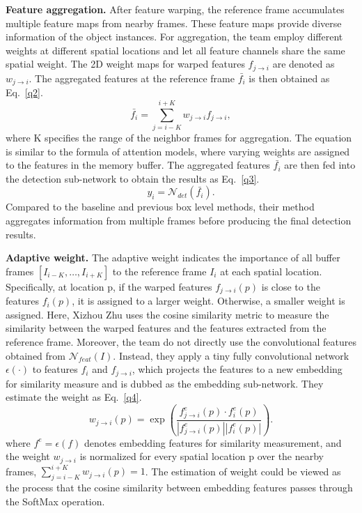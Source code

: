\documentclass[10pt,twocolumn,letterpaper]{article}
\begin{document}
{\bfseries Feature aggregation.} After feature warping, the reference frame accumulates multiple feature maps from nearby frames. These feature maps provide diverse information of the object instances. For aggregation, the team employ different weights at different spatial locations and let all feature channels share the same spatial weight. The 2D weight maps for warped features $f_{j\to i }$ are denoted as $w_{j\to i }$. The aggregated features at the reference frame $\bar{f_i}$ is then obtained as Eq.~\ref{q2}.
\begin{equation}
\bar{f_i}=\sum_{j=i-K}^{i+K}w_{j\to i}f_{j\to i}, \label{q2}
\end{equation}
where K specifies the range of the neighbor frames for aggregation. The equation is similar to the formula of attention models, where varying weights are assigned to the features in the memory buffer. The aggregated features $\bar{f_i}$ are then fed into the detection sub-network to obtain the results as Eq.~\ref{q3}.
\begin{equation}
y_i=\mathcal{N}_{det}(\bar{f_i}). \label{q3}
\end{equation}
Compared to the baseline and previous box level methods, their method aggregates information from multiple frames before producing the final detection results.

{\bfseries Adaptive weight.} The adaptive weight indicates the importance of all buffer frames $[I_{i−K},\ldots,I_{i+K}]$ to the reference frame $I_i$ at each spatial location. Specifically, at location p, if the warped features $f_{j\to i}(p)$ is close to the features $f_i(p)$, it is assigned to a larger weight. Otherwise, a smaller weight is assigned. Here, Xizhou Zhu uses the cosine similarity metric to measure the similarity between the warped features and the features extracted from the reference frame. Moreover, the team do not directly use the convolutional features obtained from $\mathcal{N}_{feat}(I)$. Instead, they apply a tiny fully convolutional network $\epsilon(·)$ to features $f_i$ and $f_{j\to i}$, which projects the features to a new embedding for similarity measure and is dubbed as the embedding sub-network. They estimate the weight as Eq.~\ref{q4}.
\begin{equation}
w_{j\to i}(p)=\exp(\frac{f_{j\to i}^e(p)\cdot f_i^e(p)}{|f_{j\to i}^e(p)||f_i^e(p)|}). \label{q4}
\end{equation}
where $f^e = \epsilon(f)$ denotes embedding features for similarity measurement, and the weight $w_{j\to i}$ is normalized for every spatial location p over the nearby frames, $\sum_{j=i-K}^{i+K}w_{j\to i}(p)= 1$. The estimation of weight could be viewed as the process that the cosine similarity between embedding features passes through the SoftMax operation.
\end{document}
